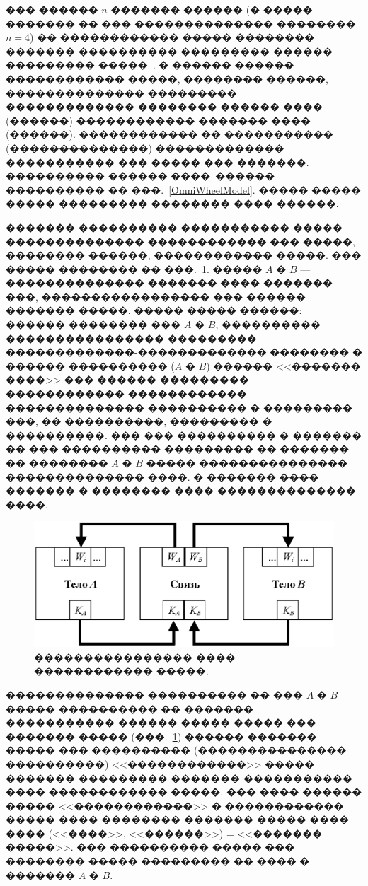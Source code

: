 \documentclass[12pt,a4paper]{article}
\begin{document}
��� ������ $n$ ������� ������ (� ����� ������� �� ��� �������������� ��������
$n=4$) �� ������������ ����� �������� ������� ���������� ��������� ������
��������� �����~\cite{Kosenko2007}. � ������ ������ ������������ �����, 
�������� ������, �������������� ��������� ������������� �������� ������ ����
(������) ������������ ������� ���� (������). ������������ �� ����������� 
(��������������) ������������� ����������� ��� ����� ��� �������. ���������� 
������ ����--������ ���������� �� ���.~\ref{OmniWheelModel}. ����� ����� �����
��������� �������� ���� ������.

������� ���������� ����������� ����� �������������� ������������ ��� �����,
�������� ������, ������������ �����. ��� ����� �������� �� 
���.~\ref{ConstraintScheme}. ����� $A$ � $B$ --- �������������� ������� ���� 
������� ���, ����������������� ��� ������ ������� �����. ����� ����� ������: 
������ �������� ��� $A$ � $B$, ���������� ���������������� ��������� 
�������������-������������� �������� � ������ ���������� ($A$ � $B$) ������
<<������� ����>> ��� ������ ��������� ������������ ������������ ��������������
���������� � ��������� ���, �� ����������, ��������� � ����������. ��� ��� 
���������� � ������� �� ��� ���������� ��������� �� ������� �� �������� $A$ � 
$B$ ����� ��������������� �������������� ����. � ������� ���� ������� � 
�������� ���� �������������� ����.

\begin{figure}[htb]
\centering\includegraphics[width=14cm]{Fig_2_1.eps}
\caption{���������������� ���� ������������ �����.}
\label{ConstraintScheme}
\end{figure}

�������������� ���������� �� ��� $A$ � $B$ ����� ���������� �� ������� 
����������� ������ ����� ����� ��� ������� ����� (���.~\ref{ConstraintScheme})
������ ������� ����� ��� ���������� (��������������� ����������) 
<<������������>> ����� ������� ��������� ������� ����������� ���� ������������
�����. ��� ���� ������ ����� <<������������>> � ������������ ����� ���� 
�������� ������� ����� ���� ���� (<<����>>, <<������>>) = <<������� �����>>. 
��� ���������� ����� ��� �������� ����� ��������� �� ���� � ������� $A$ � $B$.
\end{document}
